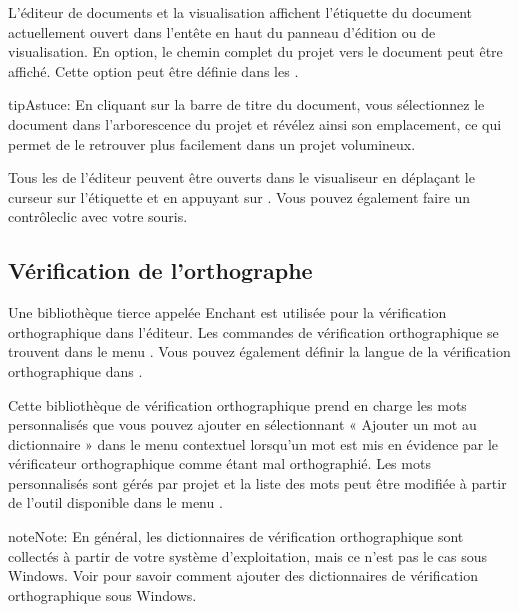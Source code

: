 \documentclass[a4paper,11pt,french]{sphinxmanual}
\begin{document}
\sphinxAtStartPar
L’éditeur de documents et la visualisation affichent l’étiquette du document actuellement ouvert dans l’en\sphinxhyphen{}tête en haut du panneau d’édition ou de visualisation. En option, le chemin complet du projet vers le document peut être affiché. Cette option peut être définie dans les .

\begin{sphinxadmonition}{tip}{Astuce:}
\sphinxAtStartPar
En cliquant sur la barre de titre du document, vous sélectionnez le document dans l’arborescence du projet et révélez ainsi son emplacement, ce qui permet de le retrouver plus facilement dans un projet volumineux.
\end{sphinxadmonition}

\sphinxAtStartPar
Tous les {\hyperref[\detokenize{int_glossary:term-Reference}]{}} de l’éditeur peuvent être ouverts dans le visualiseur en déplaçant le curseur sur l’étiquette et en appuyant sur . Vous pouvez également faire un contrôle\sphinxhyphen{}clic avec votre souris.


\subsection{Vérification de l’orthographe}
\label{\detokenize{usage_writing:spell-checking}}
\sphinxAtStartPar
Une bibliothèque tierce appelée Enchant est utilisée pour la vérification orthographique dans l’éditeur. Les commandes de vérification orthographique se trouvent dans le menu . Vous pouvez également définir la langue de la vérification orthographique dans .

\sphinxAtStartPar
Cette bibliothèque de vérification orthographique prend en charge les mots personnalisés que vous pouvez ajouter en sélectionnant « Ajouter un mot au dictionnaire » dans le menu contextuel lorsqu’un mot est mis en évidence par le vérificateur orthographique comme étant mal orthographié. Les mots personnalisés sont gérés par projet et la liste des mots peut être modifiée à partir de l’outil  disponible dans le menu .

\begin{sphinxadmonition}{note}{Note:}
\sphinxAtStartPar
En général, les dictionnaires de vérification orthographique sont collectés à partir de votre système d’exploitation, mais ce n’est pas le cas sous Windows. Voir {\hyperref[\detokenize{more_customise:a-custom-dict}]{}} pour savoir comment ajouter des dictionnaires de vérification orthographique sous Windows.
\end{sphinxadmonition}
\end{document}
